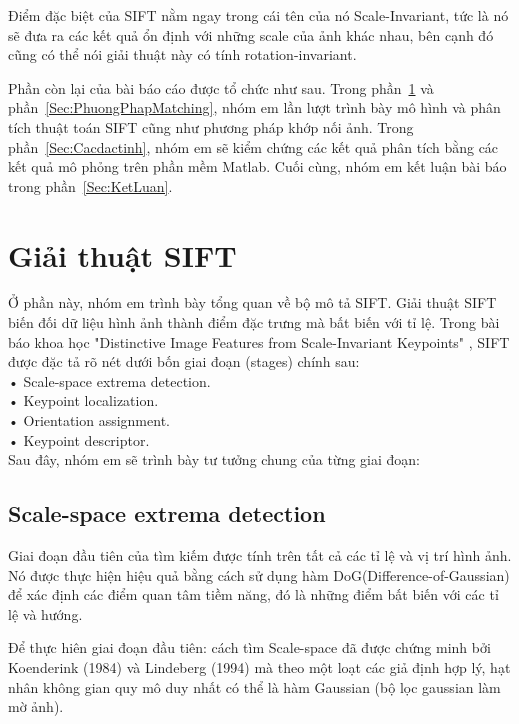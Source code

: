 \documentclass[conference]{IEEEtran}
\begin{document}
    Điểm đặc biệt của SIFT nằm ngay trong cái tên của nó Scale-Invariant, tức là nó sẽ đưa ra các kết quả ổn định với những scale của ảnh khác nhau, bên cạnh đó cũng có thể nói giải thuật này có tính rotation-invariant.
    
Phần còn lại của bài báo cáo được tổ chức như sau. Trong phần~\ref{Sec:GiaiThuatSIFT} và phần~\ref{Sec:PhuongPhapMatching}, nhóm em lần lượt trình bày mô hình và phân tích thuật toán SIFT cũng như phương pháp khớp nối ảnh. Trong phần~\ref{Sec:Cacdactinh}, nhóm em sẽ kiểm chứng các kết quả phân tích bằng các kết quả mô phỏng trên phần mềm Matlab. Cuối cùng, nhóm em kết luận bài báo trong phần~\ref{Sec:KetLuan}.


\medskip
\section{Giải thuật SIFT}
\label{Sec:GiaiThuatSIFT}
Ở phần này, nhóm em trình bày tổng quan về bộ mô tả SIFT. Giải thuật SIFT biến đối dữ liệu hình ảnh thành điểm đặc trưng mà bất biến với tỉ lệ. Trong bài báo khoa học "Distinctive Image Features from Scale-Invariant Keypoints" \cite{baibao1}, SIFT được đặc tả rõ nét dưới bốn giai đoạn (stages) chính sau:\\
    • Scale-space extrema detection.\\
    • Keypoint localization.\\
    • Orientation assignment.\\
    • Keypoint descriptor.\\
Sau đây, nhóm em sẽ trình bày tư tưởng chung của từng giai đoạn:
\subsection{Scale-space extrema detection}
Giai đoạn đầu tiên của tìm kiếm được tính trên tất cả các tỉ lệ và vị trí hình ảnh. Nó được thực hiện hiệu quả bằng cách sử dụng hàm DoG(Difference-of-Gaussian) để xác định các điểm quan tâm tiềm năng, đó là những điểm bất biến với các tỉ lệ và hướng.


Để thực hiên giai đoạn đầu tiên: cách tìm Scale-space đã được chứng minh bởi Koenderink (1984) và Lindeberg (1994) mà theo một loạt các  giả định hợp lý, hạt nhân không gian quy mô duy nhất có thể là hàm Gaussian (bộ lọc gaussian làm mờ ảnh).
\end{document}
